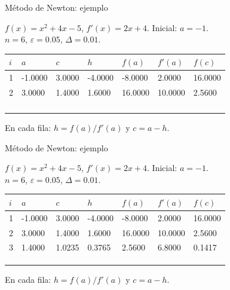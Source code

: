 \documentclass[original_version/main.tex]{subfiles}
\begin{document}
\begin{frame}[t]{Método de Newton: ejemplo}
\begin{minipage}[t][17mm]{\textwidth}\small
$f(x)=x^2+4x-5$, $f'(x)=2x+4$. Inicial: $a=-1$.\\
$n=6$, $\varepsilon=0.05$, $\Delta=0.01$.
\end{minipage}\begingroup\scriptsize\setlength{\tabcolsep}{2pt}
\begin{center}\begin{tabular}{|C{.04\textwidth}|*{6}{C{.135\textwidth}|}}\hline
$i$&$a$&$c$&$h$&$f(a)$&$f'(a)$&$f(c)$\\\hline
\rule{0pt}{5mm}1&-1.0000&3.0000&-4.0000&-8.0000&2.0000&16.0000\\\hline
\rule{0pt}{5mm}2&3.0000&1.4000&1.6000&16.0000&10.0000&2.5600\\\hline
\rule{0pt}{5mm}&&&&&&\\\hline
\rule{0pt}{5mm}&&&&&&\\\hline
\rule{0pt}{5mm}&&&&&&\\\hline
\rule{0pt}{5mm}&&&&&&\\\hline
\end{tabular}\end{center}\endgroup\small En cada fila: $h=f(a)/f\prime(a)$ y $c=a-h$.
\end{frame}
\begin{frame}[t]{Método de Newton: ejemplo}
\begin{minipage}[t][17mm]{\textwidth}\small
$f(x)=x^2+4x-5$, $f'(x)=2x+4$. Inicial: $a=-1$.\\
$n=6$, $\varepsilon=0.05$, $\Delta=0.01$.
\end{minipage}\begingroup\scriptsize\setlength{\tabcolsep}{2pt}
\begin{center}\begin{tabular}{|C{.04\textwidth}|*{6}{C{.135\textwidth}|}}\hline
$i$&$a$&$c$&$h$&$f(a)$&$f'(a)$&$f(c)$\\\hline
\rule{0pt}{5mm}1&-1.0000&3.0000&-4.0000&-8.0000&2.0000&16.0000\\\hline
\rule{0pt}{5mm}2&3.0000&1.4000&1.6000&16.0000&10.0000&2.5600\\\hline
\rule{0pt}{5mm}3&1.4000&1.0235&0.3765&2.5600&6.8000&0.1417\\\hline
\rule{0pt}{5mm}&&&&&&\\\hline
\rule{0pt}{5mm}&&&&&&\\\hline
\rule{0pt}{5mm}&&&&&&\\\hline
\end{tabular}\end{center}\endgroup\small En cada fila: $h=f(a)/f\prime(a)$ y $c=a-h$.
\end{frame}
\end{document}
